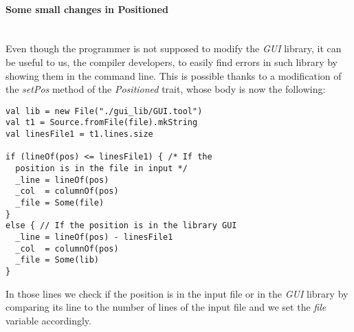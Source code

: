 \paragraph{Some small changes in Positioned} \hfill \\
Even though the programmer is not supposed to modify the \textit{GUI} library, it can be useful to us, the compiler developers, to easily find errors in such library by showing them in the command line. This is possible thanks to a modification of the \textit{setPos} method of the \textit{Positioned} trait, whose body is now the following:
\begin{lstlisting}
val lib = new File("./gui_lib/GUI.tool")
val t1 = Source.fromFile(file).mkString
val linesFile1 = t1.lines.size
    
if (lineOf(pos) <= linesFile1) { /* If the
  position is in the file in input */
  _line = lineOf(pos)
  _col  = columnOf(pos)
  _file = Some(file)
}
else { // If the position is in the library GUI
  _line = lineOf(pos) - linesFile1
  _col  = columnOf(pos)
  _file = Some(lib)
}
\end{lstlisting}
In those lines we check if the position is in the input file or in the \textit{GUI} library by comparing its line to the number of lines of the input file and we set the \textit{\textunderscore file} variable accordingly.
